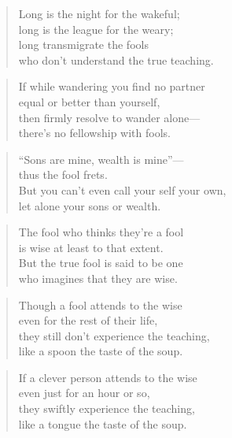 \documentclass[12pt,openany]{book}%
\begin{document}
\begin{verse}%
Long is the night for the wakeful; \\
long is the league for the weary; \\
long transmigrate the fools \\
who don’t understand the true teaching. 

%
\end{verse}

\begin{verse}%
If while wandering you find no partner \\
equal or better than yourself, \\
then firmly resolve to wander alone—\\
there’s no fellowship with fools. 

%
\end{verse}

\begin{verse}%
“Sons are mine, wealth is mine”—\\
thus the fool frets. \\
But you can’t even call your self your own, \\
let alone your sons or wealth. 

%
\end{verse}

\begin{verse}%
The fool who thinks they’re a fool \\
is wise at least to that extent. \\
But the true fool is said to be one \\
who imagines that they are wise. 

%
\end{verse}

\begin{verse}%
Though a fool attends to the wise \\
even for the rest of their life, \\
they still don’t experience the teaching, \\
like a spoon the taste of the soup. 

%
\end{verse}

\begin{verse}%
If a clever person attends to the wise \\
even just for an hour or so, \\
they swiftly experience the teaching, \\
like a tongue the taste of the soup. 

%
\end{verse}
\end{document}
